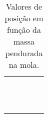 \begin{table}
\begin{tabular}{lp{25mm}p{25mm}p{25mm}l}
	\cmidrule{2-4}
	& \cellcolor[gray]{0.89} & \cellcolor[gray]{0.92} & \cellcolor[gray]{0.89} \\
	& \cellcolor[gray]{0.95} & \cellcolor[gray]{0.97} & \cellcolor[gray]{0.95} \\
	& \cellcolor[gray]{0.89} & \cellcolor[gray]{0.92} & \cellcolor[gray]{0.89} \\
	& \cellcolor[gray]{0.95} & \cellcolor[gray]{0.97} & \cellcolor[gray]{0.95} \\
	& \cellcolor[gray]{0.89} & \cellcolor[gray]{0.92} & \cellcolor[gray]{0.89} \\
	& \cellcolor[gray]{0.95} & \cellcolor[gray]{0.97} & \cellcolor[gray]{0.95} \\
	& \cellcolor[gray]{0.89} & \cellcolor[gray]{0.92} & \cellcolor[gray]{0.89} \\
	& \cellcolor[gray]{0.95} & \cellcolor[gray]{0.97} & \cellcolor[gray]{0.95} \\
	& \cellcolor[gray]{0.89} & \cellcolor[gray]{0.92} & \cellcolor[gray]{0.89} \\
	& \cellcolor[gray]{0.95} & \cellcolor[gray]{0.97} & \cellcolor[gray]{0.95} \\
	& \cellcolor[gray]{0.89} & \cellcolor[gray]{0.92} & \cellcolor[gray]{0.89} \\
	& \cellcolor[gray]{0.95} & \cellcolor[gray]{0.97} & \cellcolor[gray]{0.95} \\
	\cmidrule{2-4}
\bottomrule
\end{tabular}
\caption{Valores de posição em função da massa pendurada na mola.}
\label{Dados}
\end{table}
